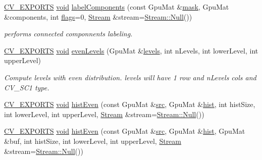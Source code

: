 \begin{DoxyCompactItemize}
\hyperlink{core_2types__c_8h_a1bf9f0e121b54272da02379cfccd0a2b}{C\-V\-\_\-\-E\-X\-P\-O\-R\-T\-S} \hyperlink{legacy_8hpp_a8bb47f092d473522721002c86c13b94e}{void} \hyperlink{namespacecv_1_1gpu_a4418321951237ef3f292a8a20b973053}{label\-Components} (const Gpu\-Mat \&\hyperlink{tracking_8hpp_a6b13ecd2fd6ec7ad422f1d7863c3ad19}{mask}, Gpu\-Mat \&components, int \hyperlink{highgui__c_8h_ae51e3a2d4365e85db9630dd3ce9508db}{flags}=0, \hyperlink{classcv_1_1gpu_1_1Stream}{Stream} \&stream=\hyperlink{classcv_1_1gpu_1_1Stream_af96c23564834f88333dcb8997df553f1}{Stream\-::\-Null}())
\begin{DoxyCompactList}\small\item\em performs connected componnents labeling. \end{DoxyCompactList}\item 
\hyperlink{core_2types__c_8h_a1bf9f0e121b54272da02379cfccd0a2b}{C\-V\-\_\-\-E\-X\-P\-O\-R\-T\-S} \hyperlink{legacy_8hpp_a8bb47f092d473522721002c86c13b94e}{void} \hyperlink{namespacecv_1_1gpu_ae731d63fbb0fd3123c11fd7534d8cfcf}{even\-Levels} (Gpu\-Mat \&\hyperlink{tracking_8hpp_a1c85c8190b686c9f597e5c1c6cc154a7}{levels}, int n\-Levels, int lower\-Level, int upper\-Level)
\begin{DoxyCompactList}\small\item\em Compute levels with even distribution. levels will have 1 row and n\-Levels cols and C\-V\-\_\-S\-C1 type. \end{DoxyCompactList}\item 
\hyperlink{core_2types__c_8h_a1bf9f0e121b54272da02379cfccd0a2b}{C\-V\-\_\-\-E\-X\-P\-O\-R\-T\-S} \hyperlink{legacy_8hpp_a8bb47f092d473522721002c86c13b94e}{void} \hyperlink{namespacecv_1_1gpu_a110be464ef972edd9424c434feeb0115}{hist\-Even} (const Gpu\-Mat \&\hyperlink{legacy_8hpp_a371cd109b74033bc4366f584edd3dacc}{src}, Gpu\-Mat \&\hyperlink{legacy_8hpp_a680f11e53e63640f03dcbb160eb06c53}{hist}, int hist\-Size, int lower\-Level, int upper\-Level, \hyperlink{classcv_1_1gpu_1_1Stream}{Stream} \&stream=\hyperlink{classcv_1_1gpu_1_1Stream_af96c23564834f88333dcb8997df553f1}{Stream\-::\-Null}())
\item 
\hyperlink{core_2types__c_8h_a1bf9f0e121b54272da02379cfccd0a2b}{C\-V\-\_\-\-E\-X\-P\-O\-R\-T\-S} \hyperlink{legacy_8hpp_a8bb47f092d473522721002c86c13b94e}{void} \hyperlink{namespacecv_1_1gpu_af03cd9c6fda9e8426591e0f32d96812a}{hist\-Even} (const Gpu\-Mat \&\hyperlink{legacy_8hpp_a371cd109b74033bc4366f584edd3dacc}{src}, Gpu\-Mat \&\hyperlink{legacy_8hpp_a680f11e53e63640f03dcbb160eb06c53}{hist}, Gpu\-Mat \&buf, int hist\-Size, int lower\-Level, int upper\-Level, \hyperlink{classcv_1_1gpu_1_1Stream}{Stream} \&stream=\hyperlink{classcv_1_1gpu_1_1Stream_af96c23564834f88333dcb8997df553f1}{Stream\-::\-Null}())

\end{DoxyCompactItemize}
